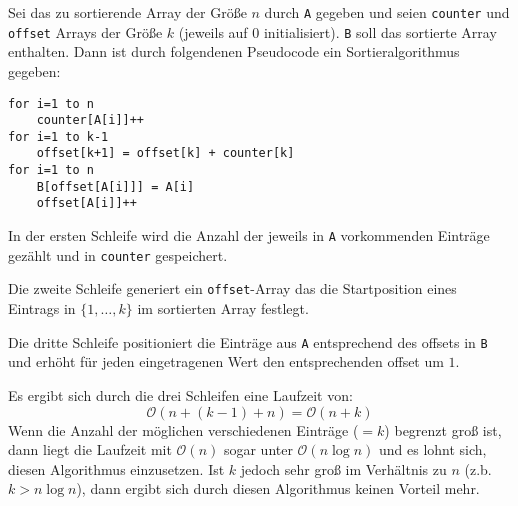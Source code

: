 \documentclass{scrartcl}
\begin{document}
Sei das zu sortierende Array der Größe $n$ durch \verb|A| gegeben und
seien \verb|counter| und \verb|offset| Arrays der Größe $k$ (jeweils auf $0$ initialisiert).
\verb|B| soll das sortierte Array enthalten.
Dann ist durch folgendenen Pseudocode ein Sortieralgorithmus gegeben:

\begin{verbatim}
for i=1 to n
    counter[A[i]]++
for i=1 to k-1
    offset[k+1] = offset[k] + counter[k]
for i=1 to n
    B[offset[A[i]]] = A[i]
    offset[A[i]]++
\end{verbatim}

In der ersten Schleife wird die Anzahl der jeweils in \verb|A| vorkommenden Einträge gezählt und in \verb|counter| gespeichert.

Die zweite Schleife generiert ein \verb|offset|-Array das die Startposition eines Eintrags in $\{1,\dotsc,k\}$ im sortierten Array festlegt.

Die dritte Schleife positioniert die Einträge aus \verb|A| entsprechend des offsets in \verb|B| und erhöht für jeden eingetragenen Wert den entsprechenden offset um $1$.

Es ergibt sich durch die drei Schleifen eine Laufzeit von:
\[
\mathcal O(n + (k-1) + n) = \mathcal O(n + k)
\]
Wenn die Anzahl der möglichen verschiedenen Einträge ($=k$) begrenzt groß ist, dann liegt die Laufzeit mit $\mathcal O(n)$ sogar unter $\mathcal O(n\log n)$ und es lohnt sich, diesen Algorithmus einzusetzen.
Ist $k$ jedoch sehr groß im Verhältnis zu $n$ (z.b. $k > n\log n$), dann ergibt sich durch diesen Algorithmus keinen Vorteil mehr.
\end{document}
